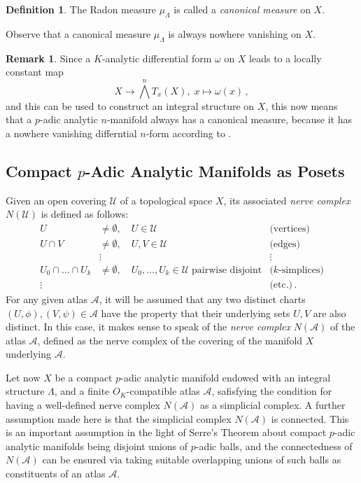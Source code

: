 \documentclass[a4paper,draft]{ZbRad}
\theoremstyle{plain}
\theoremstyle{definition}
\newtheorem{rem}{Remark}[section]
\newtheorem{dfn}{Definition}[section]
\numberwithin{equation}{section}
\begin{document}
\begin{dfn}
The Radon measure $\mu_\Lambda$ is called a \emph{canonical measure} on $X$. 
\end{dfn}

Observe that a canonical measure $\mu_\Lambda$ is always nowhere vanishing on $X$.

\begin{rem}
Since a $K$-analytic differential form $\omega$ on $X$ leads to a locally constant map
\[
X\to\bigwedge^n T_x(X),\;x\mapsto \omega(x)\,,
\]
and this can be used to construct an integral structure on $X$, this now means that
a $p$-adic analytic $n$-manifold always has a canonical measure, because it has a nowhere vanishing differntial $n$-form according to \cite[Th\'eor\`eme (2)]{Serre1965}.
\end{rem}


\subsection{Compact $p$-Adic Analytic Manifolds as Posets}

Given an open covering $\mathcal{U}$ of a topological space $X$, its associated \emph{nerve complex} $N(\mathcal{U})$ is defined as follows:
\begin{align*}
U&\neq\emptyset,\quad U\in\mathcal{U}&\text{(vertices)}
\\
U\cap V&\neq\emptyset,\quad U,V\in\mathcal{U}&\text{(edges)}
\\
&\vdots&\vdots\quad
\\
U_0\cap\dots\cap U_k&\neq\emptyset,\quad U_0,\dots,U_k\in\mathcal{U}\;\text{pairwise disjoint}&\text{($k$-simplices)}
\\
\vdots&&\text{(etc.)}\,.
\end{align*}
For any given atlas $\mathcal{A}$, it will be assumed that any two distinct charts $(U,\phi),(V,\psi)\in\mathcal{A}$ have the property that their underlying sets $U,V$ are also distinct. In this case, it makes sense to speak of the \emph{nerve complex} $N(\mathcal{A})$ of the atlas $\mathcal{A}$, defined as the nerve complex of the covering of the manifold $X$ underlying $\mathcal{A}$.
\newline

Let now $X$ be a compact $p$-adic analytic manifold endowed with an integral structure $\Lambda$, and a finite $O_K$-compatible atlas $\mathcal{A}$, safisfying the condition for having a well-defined nerve complex $N(\mathcal{A})$ as a simplicial complex. A further assumption made here is that the simplicial complex $N(\mathcal{A})$ is connected. This is an important assumption in the light of Serre's Theorem about compact $p$-adic analytic manifolds being disjoint unions of $p$-adic balls, and the connectedness of $N(\mathcal{A})$ can be ensured via taking suitable overlapping unions of such balls as constituents of an atlas $\mathcal{A}$. 
\end{document}
